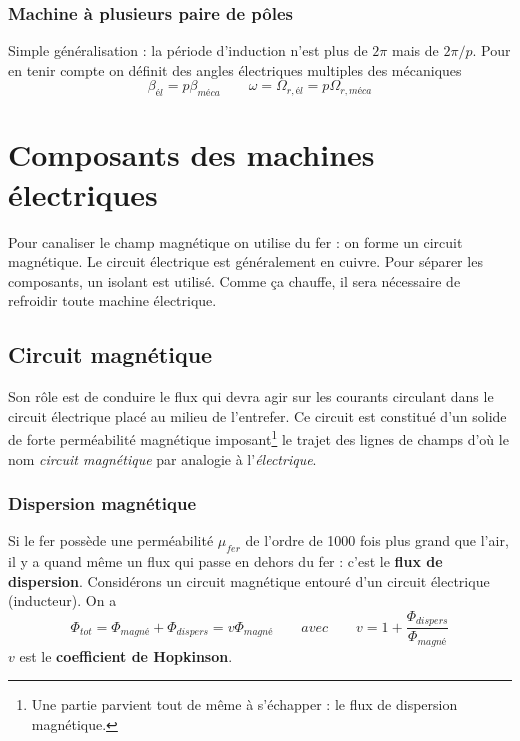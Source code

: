 		\subsubsection{Machine à plusieurs paire de pôles}
		Simple généralisation : la période d'induction n'est plus de $2\pi$ mais 
		de $2\pi/p$. Pour en tenir compte on définit des angles électriques multiples des mécaniques
		\begin{equation}
			\beta _{él} = p\beta _{méca} \qquad \omega = \Omega _{r,él} = p\Omega _{r,méca}
		\end{equation}
		
		
		
\section{Composants des machines électriques}
Pour canaliser le champ magnétique on utilise du fer : on forme un circuit 
magnétique. Le circuit électrique est généralement en cuivre. Pour séparer les composants, un isolant 
est utilisé. Comme ça chauffe, il sera nécessaire de refroidir toute machine 
électrique.

	\subsection{Circuit magnétique}
	Son rôle est de conduire le flux qui devra agir sur les courants circulant 
	dans le circuit électrique placé au milieu de l'entrefer. Ce circuit est 
	constitué d'un solide de forte perméabilité magnétique imposant\footnote{Une 
	partie parvient tout de même à s'échapper : le flux de dispersion magnétique.} 
	le trajet des lignes de champs d'où le nom \textit{circuit magnétique} par analogie 
	à l'\textit{électrique}.
	
	\subsubsection{Dispersion magnétique}
	Si le fer possède une perméabilité $\mu _{fer}$ de l'ordre de 1000 fois plus grand que l'air, il y a quand même un flux qui passe en dehors du fer : c'est le \textbf{flux de dispersion}. Considérons un circuit magnétique entouré d'un circuit électrique (inducteur). On a 
	\begin{equation}
		\Phi _{tot} = \Phi _{magné} + \Phi _{dispers} = v \Phi _{magné} \qquad avec \qquad v = 1+\frac{\Phi_{dispers}}{\Phi _{magné}}
	\end{equation}
	$v$ est le \textbf{coefficient de Hopkinson}.
	
